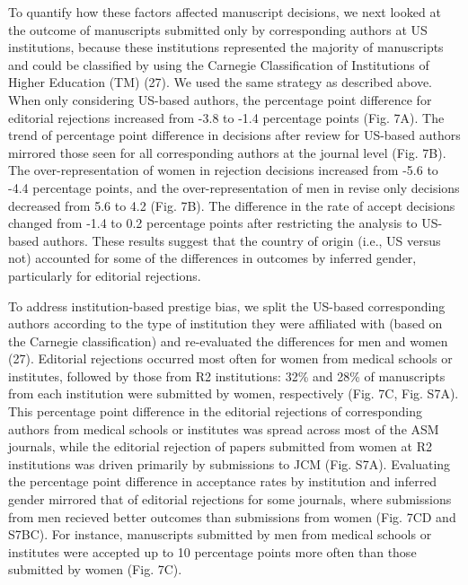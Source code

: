 \documentclass[11pt,]{article}
\begin{document}
To quantify how these factors affected manuscript decisions, we next
looked at the outcome of manuscripts submitted only by corresponding
authors at US institutions, because these institutions represented the
majority of manuscripts and could be classified by using the Carnegie
Classification of Institutions of Higher Education (TM) (27). We used
the same strategy as described above. When only considering US-based
authors, the percentage point difference for editorial rejections
increased from -3.8 to -1.4 percentage points (Fig. 7A). The trend of
percentage point difference in decisions after review for US-based
authors mirrored those seen for all corresponding authors at the journal
level (Fig. 7B). The over-representation of women in rejection decisions
increased from -5.6 to -4.4 percentage points, and the
over-representation of men in revise only decisions decreased from 5.6
to 4.2 (Fig. 7B). The difference in the rate of accept decisions changed
from -1.4 to 0.2 percentage points after restricting the analysis to
US-based authors. These results suggest that the country of origin
(i.e., US versus not) accounted for some of the differences in outcomes
by inferred gender, particularly for editorial rejections.

To address institution-based prestige bias, we split the US-based
corresponding authors according to the type of institution they were
affiliated with (based on the Carnegie classification) and re-evaluated
the differences for men and women (27). Editorial rejections occurred
most often for women from medical schools or institutes, followed by
those from R2 institutions: 32\% and 28\% of manuscripts from each
institution were submitted by women, respectively (Fig. 7C, Fig. S7A).
This percentage point difference in the editorial rejections of
corresponding authors from medical schools or institutes was spread
across most of the ASM journals, while the editorial rejection of papers
submitted from women at R2 institutions was driven primarily by
submissions to JCM (Fig. S7A). Evaluating the percentage point
difference in acceptance rates by institution and inferred gender
mirrored that of editorial rejections for some journals, where
submissions from men recieved better outcomes than submissions from
women (Fig. 7CD and S7BC). For instance, manuscripts submitted by men
from medical schools or institutes were accepted up to 10 percentage
points more often than those submitted by women (Fig. 7C).
\end{document}
